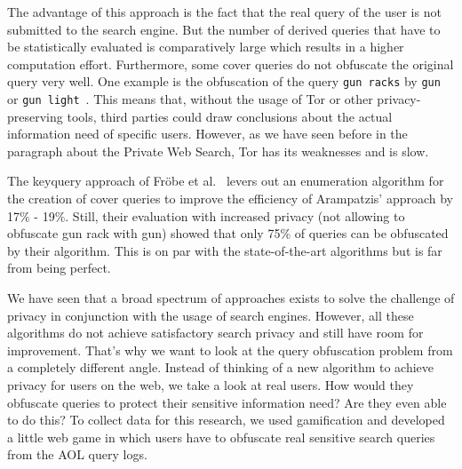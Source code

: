 The advantage of this approach is the fact that the real query of the user is not submitted to the search engine. But the number of derived queries that have to be statistically evaluated is comparatively large which results in a higher computation effort. Furthermore, some cover queries do not obfuscate the original query very well. One example is the obfuscation of the query \texttt{gun racks} by \texttt{gun} or \texttt{gun light}~\cite{arampatzis}. This means that, without the usage of Tor or other privacy-preserving tools, third parties could draw conclusions about the actual information need of specific users. However, as we have seen before in the paragraph about the Private Web Search, Tor has its weaknesses and is slow.\par
The keyquery approach of Fr{\"o}be et al.~\cite{maikPaper} levers out an enumeration algorithm for the creation of cover queries to improve the efficiency of Arampatzis' approach by 17\% - 19\%. Still, their evaluation with increased privacy (not allowing to obfuscate gun rack with gun) showed that only 75\% of queries can be obfuscated by their algorithm. This is on par with the state-of-the-art algorithms but is far from being perfect.\par
We have seen that a broad spectrum of approaches exists to solve the challenge of privacy in conjunction with the usage of search engines. However, all these algorithms do not achieve satisfactory search privacy and still have room for improvement. That's why we want to look at the query obfuscation problem from a completely different angle.
Instead of thinking of a new algorithm to achieve privacy for users on the web, we take a look at real users. How would they obfuscate queries to protect their sensitive information need? Are they even able to do this? To collect data for this research, we used gamification and developed a little web game in which users have to obfuscate real sensitive search queries from the AOL query logs.\par
